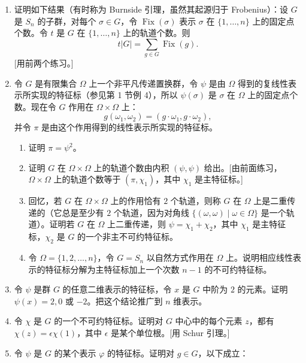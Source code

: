 \begin{enumerate}[label=\arabic*.]
\begin{enumerate}[label=(\alph*)]
    \item 令 $W=\{v\in V\mid \varphi(g)(v)=v\text{ 对所有 }g\in G\}$ 为 $V$ 中被 $G$ 所有元素逐点固定的子空间。推出 $\dim W=t$，即 $G$ 在 $\mathcal B$ 上的轨道个数。
  \end{enumerate}
  \item 证明如下结果（有时称为 Burnside 引理，虽然其起源归于 Frobenius）：设 $G$ 是 $S_n$ 的子群，对每个 $\sigma\in G$，令 $\operatorname{Fix}(\sigma)$ 表示 $\sigma$ 在 $\{1,
  \ldots,n\}$ 上的固定点个数。令 $t$ 是 $G$ 在 $\{1,
  \ldots,n\}$ 上的轨道个数。则
  \[
    t|G|=\sum_{g\in G}\operatorname{Fix}(g).
  \]
  [用前两个练习。]
  \item 令 $G$ 是有限集合 $\Omega$ 上一个非平凡传递置换群，令 $\psi$ 是由 $\Omega$ 得到的复线性表示所实现的特征标（参见第 1 节例 4），所以 $\psi(\sigma)$ 是 $\sigma$ 在 $\Omega$ 上的固定点个数。现在令 $G$ 作用在 $\Omega\times\Omega$ 上：
  \[
    g(\omega_1,
    \omega_2)=(g\cdot\omega_1,
    g\cdot\omega_2),
  \]
  并令 $\pi$ 是由这个作用得到的线性表示所实现的特征标。
  \begin{enumerate}[label=(\alph*)]
    \item 证明 $\pi=\psi^2$。
    \item 证明 $G$ 在 $\Omega\times\Omega$ 上的轨道个数由内积 $(\psi,
    \psi)$ 给出。[由前面练习，$\Omega\times\Omega$ 上的轨道个数等于 $(\pi,
    \chi_1)$，其中 $\chi_1$ 是主特征标。]
    \item 回忆，若 $G$ 在 $\Omega\times\Omega$ 上的作用恰有 $2$ 个轨道，则称 $G$ 在 $\Omega$ 上是二重传递的（它总是至少有 $2$ 个轨道，因为对角线 $\{(\omega,
    \omega)\mid \omega\in\Omega\}$ 是一个轨道）。证明若 $G$ 在 $\Omega$ 上二重传递，则 $\psi=\chi_1+\chi_2$，其中 $\chi_1$ 是主特征标，$\chi_2$ 是 $G$ 的一个非主不可约特征标。
    \item 令 $\Omega=\{1,2,
    \ldots,n\}$，令 $G=S_n$ 以自然方式作用在 $\Omega$ 上。说明相应线性表示的特征标分解为主特征标加上一个次数 $n-1$ 的不可约特征标。
  \end{enumerate}
  \item 令 $\psi$ 是群 $G$ 的任意二维表示的特征标，令 $x$ 是 $G$ 中阶为 $2$ 的元素。证明 $\psi(x)=2,0$ 或 $-2$。把这个结论推广到 $n$ 维表示。
  \item 令 $\chi$ 是 $G$ 的一个不可约特征标。证明对 $G$ 中心中的每个元素 $z$，都有 $\chi(z)=\epsilon\chi(1)$，其中 $\epsilon$ 是某个单位根。[用 Schur 引理。]
  \item 令 $\psi$ 是 $G$ 的某个表示 $\varphi$ 的特征标。证明对 $g\in G$，以下成立：
  \begin{enumerate}[label=(\alph*)]

\end{enumerate}
\end{enumerate}
